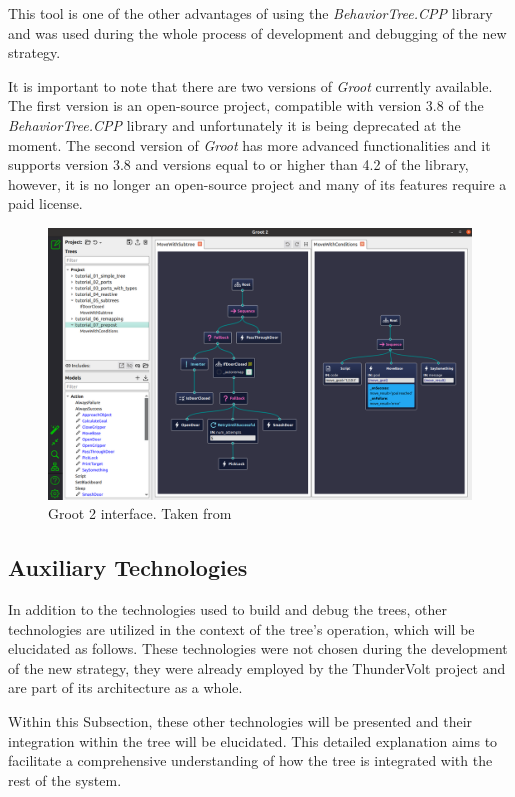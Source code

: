 This tool is one of the other advantages of using the \textit{BehaviorTree.CPP} library and was used during the whole process of development and debugging of the new strategy.

It is important to note that there are two versions of \textit{Groot} currently available. The first version is an open-source project, compatible with version 3.8 of the \textit{BehaviorTree.CPP} library and unfortunately it is being deprecated at the moment. The second version of \textit{Groot} has more advanced functionalities and it supports version 3.8 and versions equal to or higher than 4.2 of the library, however, it is no longer an open-source project and many of its features require a paid license.

\begin{figure}[h]
    \centering
    \includegraphics[width=0.75\linewidth]{chapters/development/images/Groot2.png}
    \caption{Groot 2 interface. Taken from \cite{Groot}}
    \label{fig:groot}
\end{figure}

\subsection{Auxiliary Technologies}

In addition to the technologies used to build and debug the trees, other technologies are utilized in the context of the tree's operation, which will be elucidated as follows. These technologies were not chosen during the development of the new strategy, they were already employed by the ThunderVolt project and are part of its architecture as a whole.

Within this Subsection, these other technologies will be presented and their integration within the tree will be elucidated. This detailed explanation aims to facilitate a comprehensive understanding of how the tree is integrated with the rest of the system.

